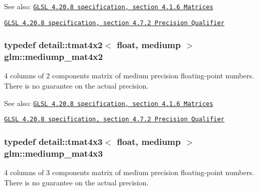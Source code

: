 \begin{Desc}
\item[See also:]\href{http://www.opengl.org/registry/doc/GLSLangSpec.4.20.8.pdf}{\tt GLSL 4.20.8 specification, section 4.1.6 Matrices} 

\href{http://www.opengl.org/registry/doc/GLSLangSpec.4.20.8.pdf}{\tt GLSL 4.20.8 specification, section 4.7.2 Precision Qualifier} \end{Desc}
\hypertarget{group__core__precision_g5ade2a6a65653683f76988c45da39f15}{
\subsubsection[mediump\_\-mat4x2]{\setlength{\rightskip}{0pt plus 5cm}typedef detail::tmat4x2$<$ float, mediump $>$ {\bf glm::mediump\_\-mat4x2}}}
\label{group__core__precision_g5ade2a6a65653683f76988c45da39f15}


4 columns of 2 components matrix of medium precision floating-point numbers. There is no guarantee on the actual precision.

\begin{Desc}
\item[See also:]\href{http://www.opengl.org/registry/doc/GLSLangSpec.4.20.8.pdf}{\tt GLSL 4.20.8 specification, section 4.1.6 Matrices} 

\href{http://www.opengl.org/registry/doc/GLSLangSpec.4.20.8.pdf}{\tt GLSL 4.20.8 specification, section 4.7.2 Precision Qualifier} \end{Desc}
\hypertarget{group__core__precision_g445d8aac3a5227af2d1e98d5c2f74d03}{
\subsubsection[mediump\_\-mat4x3]{\setlength{\rightskip}{0pt plus 5cm}typedef detail::tmat4x3$<$ float, mediump $>$ {\bf glm::mediump\_\-mat4x3}}}
\label{group__core__precision_g445d8aac3a5227af2d1e98d5c2f74d03}


4 columns of 3 components matrix of medium precision floating-point numbers. There is no guarantee on the actual precision.


